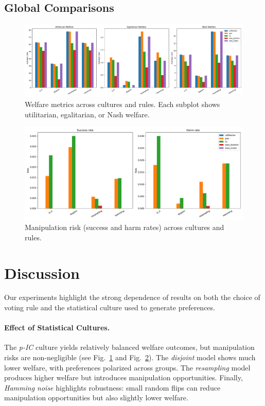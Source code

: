 \documentclass[11pt]{article}
\begin{document}
\subsection{Global Comparisons}

\begin{figure}[h!]
\centering
\includegraphics[width=\textwidth]{../figures/welfare_comparison_all.pdf}
\caption{Welfare metrics across cultures and rules. Each subplot shows utilitarian, egalitarian, or Nash welfare.}
\label{fig:welfare-global}
\end{figure}

\begin{figure}[h!]
\centering
\includegraphics[width=\textwidth]{../figures/risk_comparison_all.pdf}
\caption{Manipulation risk (success and harm rates) across cultures and rules.}
\label{fig:risk-global}
\end{figure}

\section{Discussion}
Our experiments highlight the strong dependence of results on both the choice of
voting rule and the statistical culture used to generate preferences.

\paragraph{Effect of Statistical Cultures.}
The \emph{p-IC} culture yields relatively balanced welfare outcomes, but
manipulation risks are non-negligible (see Fig.~\ref{fig:welfare-global} and
Fig.~\ref{fig:risk-global}). The \emph{disjoint} model shows much lower welfare,
with preferences polarized across groups. The \emph{resampling} model produces
higher welfare but introduces manipulation opportunities. Finally, \emph{Hamming
noise} highlights robustness: small random flips can reduce manipulation
opportunities but also slightly lower welfare.
\end{document}
